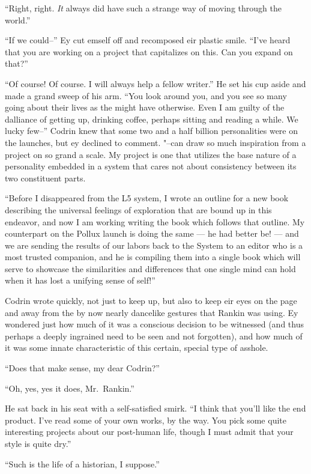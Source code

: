 ``Right, right. \emph{It} always did have such a strange way of moving through the world.''

``If we could--'' Ey cut emself off and recomposed eir plastic smile. ``I've heard that you are working on a project that capitalizes on this. Can you expand on that?''

``Of course! Of course. I will always help a fellow writer.'' He set his cup aside and made a grand sweep of his arm. ``You look around you, and you see so many going about their lives as the might have otherwise. Even I am guilty of the dalliance of getting up, drinking coffee, perhaps sitting and reading a while. We lucky few--'' Codrin knew that some two and a half billion personalities were on the launches, but ey declined to comment. "--can draw so much inspiration from a project on so grand a scale. My project is one that utilizes the base nature of a personality embedded in a system that cares not about consistency between its two constituent parts.

``Before I disappeared from the L5 system, I wrote an outline for a new book describing the universal feelings of exploration that are bound up in this endeavor, and now I am working writing the book which follows that outline. My counterpart on the Pollux launch is doing the same — he had better be! — and we are sending the results of our labors back to the System to an editor who is a most trusted companion, and he is compiling them into a single book which will serve to showcase the similarities and differences that one single mind can hold when it has lost a unifying sense of self!''

Codrin wrote quickly, not just to keep up, but also to keep eir eyes on the page and away from the by now nearly dancelike gestures that Rankin was using. Ey wondered just how much of it was a conscious decision to be witnessed (and thus perhaps a deeply ingrained need to be seen and not forgotten), and how much of it was some innate characteristic of this certain, special type of asshole.

``Does that make sense, my dear Codrin?''

``Oh, yes, yes it does, Mr.~Rankin.''

He sat back in his seat with a self-satisfied smirk. ``I think that you'll like the end product. I've read some of your own works, by the way. You pick some quite interesting projects about our post-human life, though I must admit that your style is quite dry.''

``Such is the life of a historian, I suppose.''

